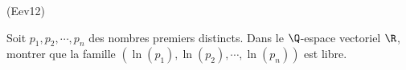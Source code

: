 \begin{tiny}(Eev12)\end{tiny} Soit $p_1, p_2,\cdots,p_n$ des nombres premiers distincts. Dans le $\Q$-espace vectoriel $\R$, montrer que la famille $\left( \ln(p_1), \ln(p_2), \cdots , \ln(p_n)\right)$ est libre.
